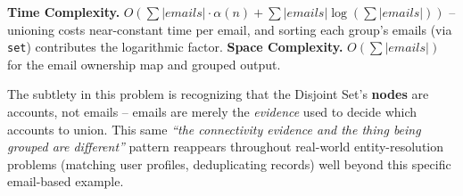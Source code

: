 \begin{complexitybox}
\textbf{Time Complexity.} $O(\sum |\textit{emails}| \cdot \alpha(n) +
\sum |\textit{emails}| \log(\sum |\textit{emails}|))$ -- unioning
costs near-constant time per email, and sorting each group's emails
(via \texttt{set}) contributes the logarithmic factor.
\textbf{Space Complexity.} $O(\sum |\textit{emails}|)$ for the email
ownership map and grouped output.
\end{complexitybox}

\begin{takeawaybox}
The subtlety in this problem is recognizing that the Disjoint Set's
\textbf{nodes} are accounts, not emails -- emails are merely the
\emph{evidence} used to decide which accounts to union. This same
\textit{``the connectivity evidence and the thing being grouped are
different''} pattern reappears throughout real-world entity-resolution
problems (matching user profiles, deduplicating records) well beyond
this specific email-based example.
\end{takeawaybox}
